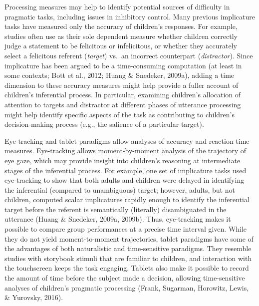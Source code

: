 \documentclass[a4paper,man,apacite,floatsintext]{apa6}
\begin{document}
Processing measures may help to identify potential sources of difficulty
in pragmatic tasks, including issues in inhibitory control. Many
previous implicature tasks have measured only the accuracy of children's
responses. For example, studies often use as their sole dependent
measure whether children correctly judge a statement to be felicitous or
infelicitous, or whether they accurately select a felicitous referent
(\emph{target}) vs.~an incorrect counterpart (\emph{distractor}). Since
implicature has been argued to be a time-consuming computation (at least
in some contexts; Bott et al., 2012; Huang \& Snedeker, 2009a), adding a
time dimension to these accuracy measures might help provide a fuller
account of children's inferential process. In particular, examining
children's allocation of attention to targets and distractor at
different phases of utterance processing might help identify specific
aspects of the task as contributing to children's decision-making
process (e.g., the salience of a particular target).

Eye-tracking and tablet paradigms allow analyses of accuracy and
reaction time measures. Eye-tracking allows moment-by-moment analysis of
the trajectory of eye gaze, which may provide insight into children's
reasoning at intermediate stages of the inferential process. For
example, one set of implicature tasks used eye-tracking to show that
both adults and children were delayed in identifying the inferential
(compared to unambiguous) target; however, adults, but not children,
computed scalar implicatures rapidly enough to identify the inferential
target before the referent is semantically (literally) disambiguated in
the utterance (Huang \& Snedeker, 2009a, 2009b). Thus, eye-tracking
makes it possible to compare group performances at a precise time
interval given. While they do not yield moment-to-moment trajectories,
tablet paradigms have some of the advantages of both naturalistic and
time-sensitive paradigms. They resemble studies with storybook stimuli
that are familiar to children, and interaction with the touchscreen
keeps the task engaging. Tablets also make it possible to record the
amount of time before the subject made a decision, allowing
time-sensitive analyses of children's pragmatic processing (Frank,
Sugarman, Horowitz, Lewis, \& Yurovsky, 2016).
\end{document}
